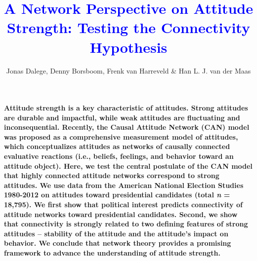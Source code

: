 \documentclass[10pt]{article}
\title{\vspace{-2.0cm}\textbf{\textcolor{blue}{A Network Perspective on Attitude Strength: Testing the Connectivity Hypothesis}}}
\date{}
\author{Jonas Dalege, Denny Borsboom, Frenk van Harreveld \& Han L. J. van der Maas}
\affil{Department of Psychology, University of Amsterdam, 1018 WT Amsterdam, The Netherlands}
\begin{document}
\maketitle

\section*{\vspace{-8ex}} 
\textbf{Attitude strength is a key characteristic of attitudes. Strong attitudes are durable and impactful, while weak attitudes are fluctuating and inconsequential. Recently, the Causal Attitude Network (CAN) model was proposed as a comprehensive measurement model of attitudes, which conceptualizes attitudes  as networks of causally connected evaluative reactions (i.e., beliefs, feelings, and behavior toward an attitude object). Here, we test the central postulate of the CAN model that highly connected attitude networks correspond to strong attitudes. We use data from the American National Election Studies 1980-2012 on attitudes toward presidential candidates (total \textit{n} = 18,795). We first show that political interest predicts  connectivity of attitude networks toward presidential candidates. Second, we show that connectivity is strongly related to two defining features of strong attitudes -- stability of the attitude and the attitude's impact on behavior. We conclude that network theory provides a promising framework to advance the understanding of attitude strength.}
\end{document}

